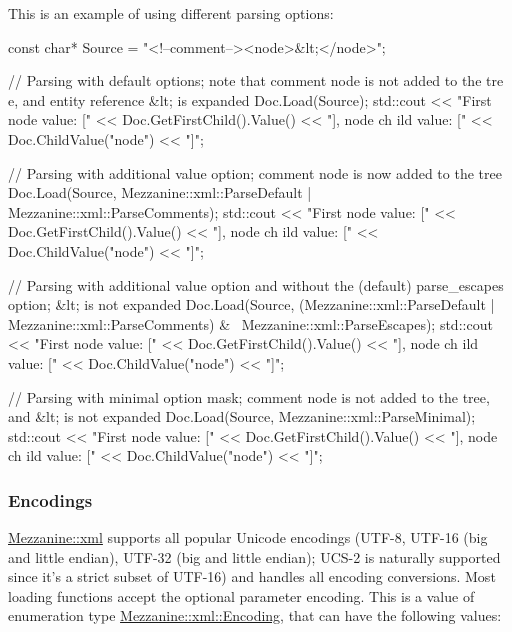 This is an example of using different parsing options: 
\begin{DoxyCode}
 const char* Source = "<!--comment--><node>&lt;</node>";

  // Parsing with default options; note that comment node is not added to the tre
      e, and entity reference &lt; is expanded
 Doc.Load(Source);
 std::cout << "First node value: [" << Doc.GetFirstChild().Value() << "], node ch
      ild value: [" << Doc.ChildValue("node") << "]\n";

 // Parsing with additional value option; comment node is now added to the tree
 Doc.Load(Source, Mezzanine::xml::ParseDefault | Mezzanine::xml::ParseComments);
 std::cout << "First node value: [" << Doc.GetFirstChild().Value() << "], node ch
      ild value: [" << Doc.ChildValue("node") << "]\n";

 // Parsing with additional value option and without the (default) parse_escapes 
      option; &lt; is not expanded
 Doc.Load(Source, (Mezzanine::xml::ParseDefault | Mezzanine::xml::ParseComments) 
      & ~Mezzanine::xml::ParseEscapes);
 std::cout << "First node value: [" << Doc.GetFirstChild().Value() << "], node ch
      ild value: [" << Doc.ChildValue("node") << "]\n";

 // Parsing with minimal option mask; comment node is not added to the tree, and 
      &lt; is not expanded
 Doc.Load(Source, Mezzanine::xml::ParseMinimal);
 std::cout << "First node value: [" << Doc.GetFirstChild().Value() << "], node ch
      ild value: [" << Doc.ChildValue("node") << "]\n";
\end{DoxyCode}
 \hypertarget{XMLManual_XMLLoadingEncodings}{}\subsubsection{Encodings}\label{XMLManual_XMLLoadingEncodings}
\hyperlink{namespaceMezzanine_1_1xml}{Mezzanine::xml} supports all popular Unicode encodings (UTF-\/8, UTF-\/16 (big and little endian), UTF-\/32 (big and little endian); UCS-\/2 is naturally supported since it's a strict subset of UTF-\/16) and handles all encoding conversions. Most loading functions accept the optional parameter encoding. This is a value of enumeration type \hyperlink{namespaceMezzanine_1_1xml_ab1e7e96991b9c08ac13e797a15253804}{Mezzanine::xml::Encoding}, that can have the following values:
